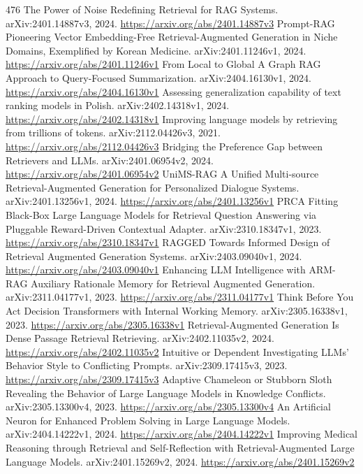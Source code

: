 \documentclass[11pt]{article}
\begin{document}
\begin{thebibliography}{476}
 The Power of Noise Redefining Retrieval for RAG Systems. arXiv:2401.14887v3, 2024. \url{https://arxiv.org/abs/2401.14887v3}
 Prompt-RAG Pioneering Vector Embedding-Free Retrieval-Augmented Generation in Niche Domains, Exemplified by Korean Medicine. arXiv:2401.11246v1, 2024. \url{https://arxiv.org/abs/2401.11246v1}
 From Local to Global A Graph RAG Approach to Query-Focused Summarization. arXiv:2404.16130v1, 2024. \url{https://arxiv.org/abs/2404.16130v1}
 Assessing generalization capability of text ranking models in Polish. arXiv:2402.14318v1, 2024. \url{https://arxiv.org/abs/2402.14318v1}
 Improving language models by retrieving from trillions of tokens. arXiv:2112.04426v3, 2021. \url{https://arxiv.org/abs/2112.04426v3}
 Bridging the Preference Gap between Retrievers and LLMs. arXiv:2401.06954v2, 2024. \url{https://arxiv.org/abs/2401.06954v2}
 UniMS-RAG A Unified Multi-source Retrieval-Augmented Generation for Personalized Dialogue Systems. arXiv:2401.13256v1, 2024. \url{https://arxiv.org/abs/2401.13256v1}
 PRCA Fitting Black-Box Large Language Models for Retrieval Question Answering via Pluggable Reward-Driven Contextual Adapter. arXiv:2310.18347v1, 2023. \url{https://arxiv.org/abs/2310.18347v1}
 RAGGED Towards Informed Design of Retrieval Augmented Generation Systems. arXiv:2403.09040v1, 2024. \url{https://arxiv.org/abs/2403.09040v1}
 Enhancing LLM Intelligence with ARM-RAG Auxiliary Rationale Memory for Retrieval Augmented Generation. arXiv:2311.04177v1, 2023. \url{https://arxiv.org/abs/2311.04177v1}
 Think Before You Act Decision Transformers with Internal Working Memory. arXiv:2305.16338v1, 2023. \url{https://arxiv.org/abs/2305.16338v1}
 Retrieval-Augmented Generation Is Dense Passage Retrieval Retrieving. arXiv:2402.11035v2, 2024. \url{https://arxiv.org/abs/2402.11035v2}
 Intuitive or Dependent Investigating LLMs' Behavior Style to Conflicting Prompts. arXiv:2309.17415v3, 2023. \url{https://arxiv.org/abs/2309.17415v3}
 Adaptive Chameleon or Stubborn Sloth Revealing the Behavior of Large Language Models in Knowledge Conflicts. arXiv:2305.13300v4, 2023. \url{https://arxiv.org/abs/2305.13300v4}
 An Artificial Neuron for Enhanced Problem Solving in Large Language Models. arXiv:2404.14222v1, 2024. \url{https://arxiv.org/abs/2404.14222v1}
 Improving Medical Reasoning through Retrieval and Self-Reflection with Retrieval-Augmented Large Language Models. arXiv:2401.15269v2, 2024. \url{https://arxiv.org/abs/2401.15269v2}

\end{thebibliography}
\end{document}
